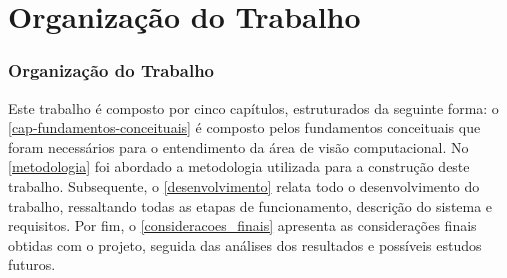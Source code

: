 \section{Organização do Trabalho}
\begin{frame}
\frametitle{Organização do Trabalho}

Este trabalho é composto por cinco capítulos, estruturados da seguinte forma: o \autoref{cap-fundamentos-conceituais} é composto pelos fundamentos conceituais que foram necessários para o entendimento da área de visão computacional. No \autoref{metodologia} foi abordado a metodologia utilizada para a construção deste trabalho.  Subsequente, o \autoref{desenvolvimento} relata todo o desenvolvimento do trabalho, ressaltando todas as etapas de funcionamento, descrição do sistema e requisitos. Por fim, o \autoref{consideracoes_finais} apresenta as considerações finais obtidas com o projeto, seguida das análises dos resultados e possíveis estudos futuros.

\end{frame}